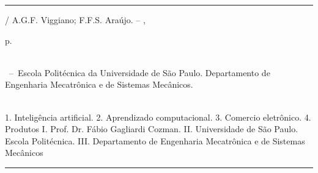 \begin{fichacatalografica}\label{ficha catalografica}
	\vspace*{\fill}					%
	\hrule							%
	\begin{center}					%
	\begin{minipage}[c]{12.5cm}		%
	
	\imprimirautor
	
	\hspace{0.5cm} \imprimirtitulo  / A.G.F. Viggiano; F.F.S. Araújo. --
	\imprimirlocal, \imprimirdata
	
	\hspace{0.5cm} \pageref{LastPage} p.\\
	
	\hspace{0.5cm} \imprimirorientadorRotulo~\imprimirorientador\\
	
	\hspace{0.5cm}
	\parbox[t]{\textwidth}{\imprimirtipotrabalho~--~Escola Politécnica da Universidade de São Paulo. Departamento de Engenharia Mecatrônica e de Sistemas Mecânicos.}\\
	
	\hspace{0.5cm}
		1. Inteligência artificial.
		2. Aprendizado computacional.
		3. Comercio eletrônico.
		4. Produtos
		I. Prof. Dr. Fábio Gagliardi Cozman.
		II. Universidade de São Paulo. Escola Politécnica.
		III. Departamento de Engenharia Mecatrônica e de Sistemas Mecânicos\\ 
	
	
	\end{minipage}
	\end{center}
	\hrule
\end{fichacatalografica}